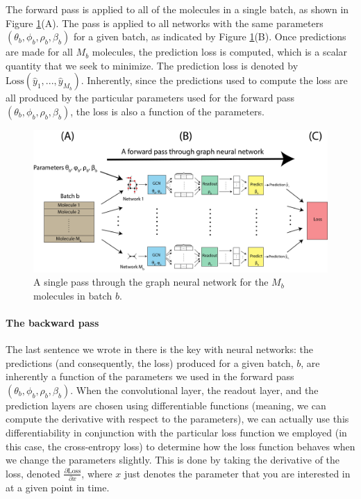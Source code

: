 The forward pass is applied to all of the molecules in a single batch, as shown in Figure \ref{fig:next:gnn:forward}(A). The pass is applied to all networks with the same parameters $(\theta_b, \phi_b, \rho_b, \beta_b)$ for a given batch, as indicated by Figure \ref{fig:next:gnn:forward}(B). Once predictions are made for all $M_b$ molecules, the prediction loss is computed, which is a scalar quantity that we seek to minimize. The prediction loss is denoted by $\text{Loss}\left(\hat y_1, ..., \hat y_{M_b}\right)$. Inherently, since the predictions used to compute the loss are all produced by the particular parameters used for the forward pass $(\theta_b, \phi_b, \rho_b, \beta_b)$, the loss is also a function of the parameters. 

\begin{figure}
    \centering
    \includegraphics[width=\linewidth]{next/Images/forward_pass.png}
    \caption[Forward pass of GNN]{A single pass through the graph neural network for the $M_b$ molecules in batch $b$.}
    \label{fig:next:gnn:forward}
\end{figure}
\paragraph*{The backward pass}

The last sentence we wrote in there is the key with neural networks: the predictions (and consequently, the loss) produced for a given batch, $b$, are inherently a function of the parameters we used in the forward pass $(\theta_b, \phi_b, \rho_b, \beta_b)$. When the convolutional layer, the readout layer, and the prediction layers are chosen using differentiable functions (meaning, we can compute the derivative with respect to the parameters), we can actually use this differentiability in conjunction with the particular loss function we employed (in this case, the cross-entropy loss) to determine how the loss function behaves when we change the parameters slightly. This is done by taking the derivative of the loss, denoted $\frac{\partial \text{Loss}}{\partial x}$, where $x$ just denotes the parameter that you are interested in at a given point in time. 

